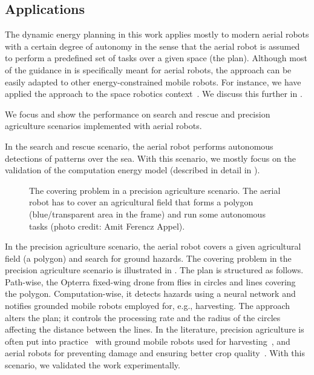 \subsection{Applications}

The dynamic energy planning in this work applies mostly to modern aerial robots with a certain degree of autonomy in the sense that the aerial robot is assumed to perform a predefined set of tasks over a given space (the plan). Although most of the guidance in  is specifically meant for aerial robots, the approach can be easily adapted to other energy-constrained mobile robots. For instance, we have applied the approach to the space robotics context~\citep{seewald2020beyond}. We discuss this further in .

We focus and show the performance on search and rescue and precision agriculture scenarios implemented with aerial robots. 

In the search and rescue scenario, the aerial robot performs autonomous detections of patterns over the sea. With this scenario, we mostly focus on the validation of the computation energy model (described in detail in ).

\begin{figure}[h]
  \centering
  
  \caption[The covering problem in a precision agriculture scenario]{The covering problem in a precision agriculture scenario. The aerial robot has to cover an agricultural field that forms a polygon (blue/transparent area in the frame) and run some autonomous tasks {\scriptsize(photo credit: Amit Ferencz Appel)}.}
  \label{fig:plot2}
\end{figure}

In the precision agriculture scenario, the aerial robot covers a given agricultural field (a polygon) and search for ground hazards. The covering problem in the precision agriculture scenario is illustrated in . The plan is structured as follows. Path-wise, the Opterra fixed-wing drone from  flies in circles and lines covering the polygon. Computation-wise, it detects hazards using a neural network and notifies grounded mobile robots employed for, e.g., harvesting. The approach alters the plan; it controls the processing rate and the radius of the circles affecting the distance between the lines. In the literature, precision agriculture is often put into practice~\citep{hajjaj2014review} with ground mobile robots used for harvesting~\citep{qingchun2012study,dong2011development, de2011design, aljanobi2010setup, li2008analysis, edan2000robotic}, and aerial robots for preventing damage and ensuring better crop quality~\citep{puri2017agriculture, daponte2019review}. With this scenario, we validated the work experimentally.

